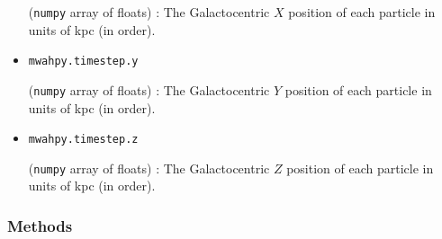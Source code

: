 \documentclass{article}
\begin{document}
\begin{itemize}
(\verb!numpy! array of floats) : The Galactocentric $X$ position of each particle in units of kpc (in order). 

\item \verb!mwahpy.timestep.y!

(\verb!numpy! array of floats) : The Galactocentric $Y$ position of each particle in units of kpc (in order). 

\item \verb!mwahpy.timestep.z!

(\verb!numpy! array of floats) : The Galactocentric $Z$ position of each particle in units of kpc (in order). 


\end{itemize}

\subsubsection{Methods}
\end{document}
